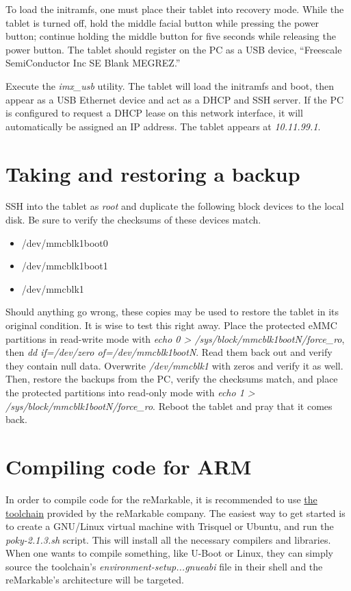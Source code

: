 \documentclass{memoir}
\begin{document}
To load the initramfs, one must place their tablet into recovery mode. While the tablet is turned off, hold the middle facial button while pressing the power button; continue holding the middle button for five seconds while releasing the power button. The tablet should register on the PC as a USB device, ``Freescale SemiConductor Inc SE Blank MEGREZ.''

Execute the \textit{imx\_usb} utility. The tablet will load the initramfs and boot, then appear as a USB Ethernet device and act as a DHCP and SSH server. If the PC is configured to request a DHCP lease on this network interface, it will automatically be assigned an IP address. The tablet appears at \textit{10.11.99.1}.

\section{Taking and restoring a backup}
SSH into the tablet as \textit{root} and duplicate the following block devices to the local disk. Be sure to verify the checksums of these devices match.

\begin{itemize}
\item{/dev/mmcblk1boot0}
\item{/dev/mmcblk1boot1}
\item{/dev/mmcblk1}
\end{itemize}

Should anything go wrong, these copies may be used to restore the tablet in its original condition. It is wise to test this right away. Place the protected eMMC partitions in read-write mode with \textit{echo 0 > /sys/block/mmcblk1bootN/force\_ro}, then \textit{dd if=/dev/zero of=/dev/mmcblk1bootN}. Read them back out and verify they contain null data. Overwrite \textit{/dev/mmcblk1} with zeros and verify it as well. Then, restore the backups from the PC, verify the checksums match, and place the protected partitions into read-only mode with \textit{echo 1 > /sys/block/mmcblk1bootN/force\_ro}. Reboot the tablet and pray that it comes back.

\section{Compiling code for ARM}
In order to compile code for the reMarkable, it is recommended to use \href{https://remarkable.engineering/deploy/sdk/}{the toolchain} provided by the reMarkable company. The easiest way to get started is to create a GNU/Linux virtual machine with Trisquel or Ubuntu, and run the \textit{poky-2.1.3.sh} script. This will install all the necessary compilers and libraries. When one wants to compile something, like U-Boot or Linux, they can simply source the toolchain's \textit{environment-setup...gnueabi} file in their shell and the reMarkable's architecture will be targeted.
\end{document}
